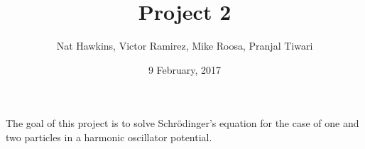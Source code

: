 \documentclass{article}
\title{Project 2}
\author{Nat Hawkins, Victor Ramirez, Mike Roosa, Pranjal Tiwari}
\date{9 February, 2017}
\begin{document}
\maketitle

\begin{abstract}
\end{abstract}
The goal of this project is to solve Schrödinger's equation for the case of one and two particles in a harmonic oscillator potential. 
\end{document}
